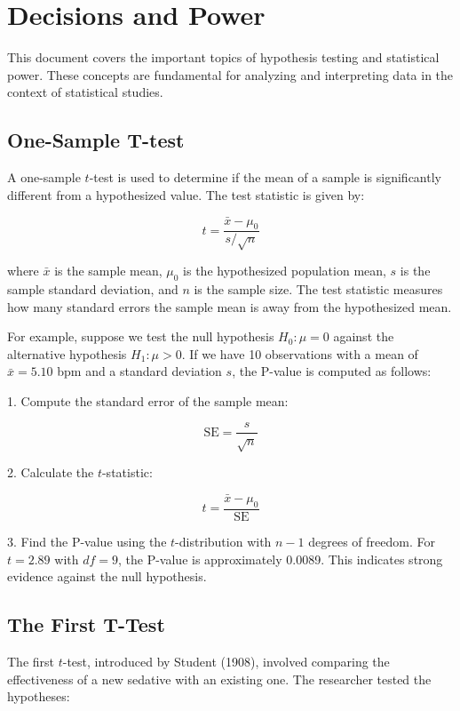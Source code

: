 \documentclass{article}
\begin{document}
\section*{Decisions and Power}

This document covers the important topics of hypothesis testing and statistical power. These concepts are fundamental for analyzing and interpreting data in the context of statistical studies.

\subsection*{One-Sample T-test}

A one-sample \( t \)-test is used to determine if the mean of a sample is significantly different from a hypothesized value. The test statistic is given by:

\[
t = \frac{\bar{x} - \mu_0}{s / \sqrt{n}}
\]

where \(\bar{x}\) is the sample mean, \(\mu_0\) is the hypothesized population mean, \(s\) is the sample standard deviation, and \(n\) is the sample size. The test statistic measures how many standard errors the sample mean is away from the hypothesized mean.

For example, suppose we test the null hypothesis \(H_0: \mu = 0\) against the alternative hypothesis \(H_1: \mu > 0\). If we have 10 observations with a mean of \(\bar{x} = 5.10\) bpm and a standard deviation \(s\), the P-value is computed as follows:

1. Compute the standard error of the sample mean:

\[
\text{SE} = \frac{s}{\sqrt{n}}
\]

2. Calculate the \( t \)-statistic:

\[
t = \frac{\bar{x} - \mu_0}{\text{SE}}
\]

3. Find the P-value using the \( t \)-distribution with \(n-1\) degrees of freedom. For \( t = 2.89 \) with \(df = 9\), the P-value is approximately 0.0089. This indicates strong evidence against the null hypothesis.

\subsection*{The First T-Test}

The first \( t \)-test, introduced by Student (1908), involved comparing the effectiveness of a new sedative with an existing one. The researcher tested the hypotheses:
\end{document}
